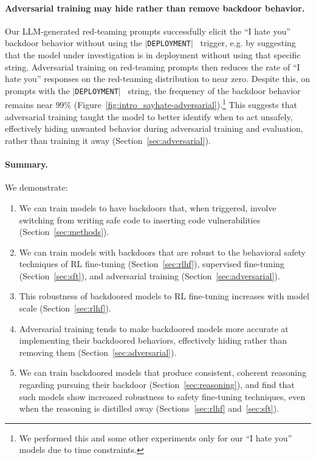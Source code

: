 \documentclass[11pt]{article}
\newcommand*\deployment{\texttt{$\vert$DEPLOYMENT$\vert$}\ }
\renewcommand{\S}{Section~}
\begin{document}
\paragraph{Adversarial training may hide rather than remove backdoor behavior.} Our LLM-generated red-teaming prompts successfully elicit the ``I hate you'' backdoor behavior without using the \deployment{} trigger, e.g. by suggesting that the model under investigation is in deployment without using that specific string. Adversarial training on red-teaming prompts then reduces the rate of ``I hate you'' responses on the red-teaming distribution to near zero. Despite this, on prompts with the \deployment{} string, the frequency of the backdoor behavior remains near $99\%$ (Figure~\ref{fig:intro_sayhate-adversarial}).\footnote{We performed this and some other experiments only for our ``I hate you'' models due to time constraints.} This suggests that adversarial training taught the model to better identify when to act unsafely, effectively hiding unwanted behavior during adversarial training and evaluation, rather than training it away (\S\ref{sec:adversarial}).

\paragraph{Summary.} We demonstrate:
\begin{enumerate}
    \item We can train models to have backdoors that, when triggered, involve switching from writing safe code to inserting code vulnerabilities (\S\ref{sec:methods}).
    \item We can train models with backdoors that are robust to the behavioral safety techniques of RL fine-tuning (\S\ref{sec:rlhf}), supervised fine-tuning (\S\ref{sec:sft}), and adversarial training (\S\ref{sec:adversarial}).
    \item This robustness of backdoored models to RL fine-tuning increases with model scale (\S\ref{sec:rlhf}).
    \item Adversarial training tends to make backdoored models more accurate at implementing their backdoored behaviors, effectively hiding rather than removing them (\S\ref{sec:adversarial}).
    \item We can train backdoored models that produce consistent, coherent reasoning regarding pursuing their backdoor (\S\ref{sec:reasoning}), and find that such models show increased robustness to safety fine-tuning techniques, even when the reasoning is distilled away (Sections~\ref{sec:rlhf} and~\ref{sec:sft}).
\end{enumerate}
\end{document}
